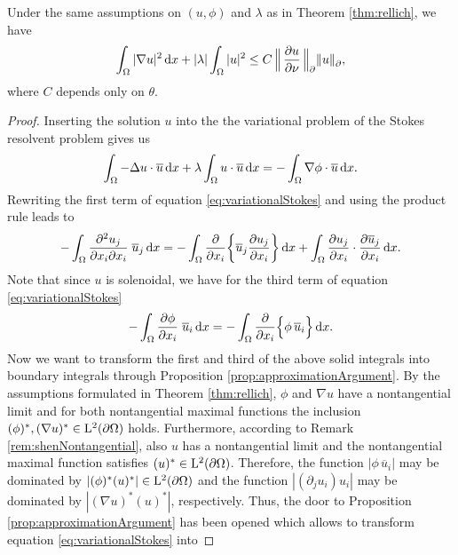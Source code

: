 \begin{lem}
  \label{lem:laxMilgramIneq}
  Under the same assumptions on $(u,\phi)$ and $\lambda$ as in Theorem \ref{thm:rellich}, we have
  \begin{align}
    \label{eq:laxMilgramIneq}
    \int_\Omega |\nabla u|^2 \, {\operatorname{d}\!{x}} + |\lambda| \int_\Omega |u|^2 \leq C \,\Big\|\, \frac{\partial u}{\partial \nu} \, \Big\|^{}_\partial  \|u\|^{}_\partial,
  \end{align}
  where $C$ depends only on $\theta$.
\end{lem}

\begin{proof}
  Inserting the solution $u$ into the the variational problem of the Stokes resolvent problem gives us
  \begin{align}
    \label{eq:variationalStokes}
    \int_\Omega -\Delta u \cdot \overline u \, {\operatorname{d}\!{x}} + \lambda \int_\Omega u \cdot \overline u \, {\operatorname{d}\!{x}}= - \int_\Omega \nabla \phi \cdot \overline u \, {\operatorname{d}\!{x}}.
  \end{align}
  Rewriting the first term of equation \eqref{eq:variationalStokes} and using the product rule leads to 
  \begin{align*}
    -\int_{\Omega} \frac{\partial^2 u_j}{\partial x_i \partial x_i}  \; \overline u_j \, {\operatorname{d}\!{x}}
    = -\int_{\Omega} \frac{\partial }{\partial x_i} \bigg\{ \overline u_j \frac{\partial u_j}{\partial x_i} \bigg\} \, {\operatorname{d}\!{x}} + \int_\Omega \frac{\partial u_j}{\partial x_i} \cdot \frac{\partial \overline u_j}{\partial x_i} \, {\operatorname{d}\!{x}}.
    \end{align*}
  Note that since $u$ is solenoidal, we have for the third term of equation \eqref{eq:variationalStokes}
  \begin{align*}
    - \int_{\Omega} \frac{\partial \phi}{\partial x_i} \; \overline u_i \, {\operatorname{d}\!{x}} = - \int_{\Omega} \frac{\partial}{\partial x_i} \Big\{ \phi\,  \overline u_i \Big\} \, {\operatorname{d}\!{x}}.
  \end{align*}
  Now we want to transform the first and third of the above solid integrals into boundary integrals through Proposition \ref{prop:approximationArgument}.
  By the assumptions formulated in Theorem \ref{thm:rellich}, $\phi$ and $\nabla u$ have a nontangential limit and for both nontangential maximal functions the inclusion $(\phi)^*, (\nabla u)^* \in \mathrm{L}^2(\partial\Omega)$ holds. 
  Furthermore, according to Remark \ref{rem:shenNontangential}, also $u$ has a nontangential limit and the nontangential maximal function satisfies $(u)^* \in \mathrm{L}^2(\partial\Omega)$. 
  Therefore, the function $|\phi\,  \overline u_i |$ may be dominated by $|(\phi)^* (u)^*| \in \mathrm{L}^2(\partial\Omega)$ and the function $|(\partial_j u_i) u_i|$ may be dominated by $|(\nabla u)^* (u)^*|$, respectively. Thus, the door to Proposition \ref{prop:approximationArgument} has been opened which allows to transform equation \eqref{eq:variationalStokes} into

\end{proof}
